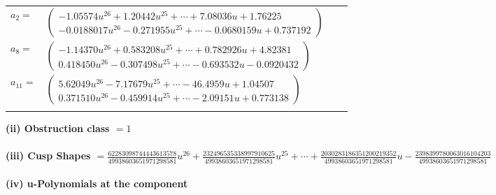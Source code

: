 \documentclass[1p]{elsarticle_modified}
\theoremstyle{definition}
\begin{document}
\begin{tabular}{m{7pt} m{180pt} m{7pt} m{180pt} }
\flushright $a_{2}=$&$\begin{pmatrix}-1.05574 u^{26}+1.20442 u^{25}+\cdots+7.08036 u+1.76225\\-0.0188017 u^{26}-0.271955 u^{25}+\cdots-0.0680159 u+0.737192\end{pmatrix}$ \\
\flushright $a_{8}=$&$\begin{pmatrix}-1.14370 u^{26}+0.583208 u^{25}+\cdots+0.782926 u+4.82381\\0.418450 u^{26}-0.307498 u^{25}+\cdots-0.693532 u-0.0920432\end{pmatrix}$ \\
\flushright $a_{11}=$&$\begin{pmatrix}5.62049 u^{26}-7.17679 u^{25}+\cdots-46.4959 u+1.04507\\0.371510 u^{26}-0.459914 u^{25}+\cdots-2.09151 u+0.773138\end{pmatrix}$\\&\end{tabular}
\flushleft \textbf{(ii) Obstruction class $= 1$}\\~\\
\flushleft \textbf{(iii) Cusp Shapes $= \frac{62283098744443613578}{49938603651971298581} u^{26}+\frac{232496535338997910625}{49938603651971298581} u^{25}+\cdots+\frac{2030283186351200219352}{49938603651971298581} u-\frac{2398399780063016104203}{49938603651971298581}$}\\~\\
\newpage\renewcommand{\arraystretch}{1}
\flushleft \textbf{(iv) u-Polynomials at the component}\newline \\
\end{document}
